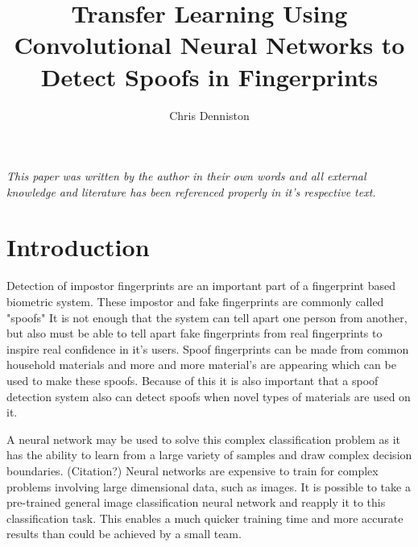 \documentclass[]{article}
\title{Transfer Learning Using Convolutional Neural Networks to Detect Spoofs in Fingerprints}
\author{Chris Denniston}
\begin{document}
\maketitle

\begin{abstract}
\end{abstract}
\textit{This paper was written by the author in their own words and all external knowledge and literature has been referenced properly in it's respective text.}
\section{Introduction}
Detection of impostor fingerprints are an important part of a fingerprint based biometric system. These impostor and fake fingerprints are commonly called "spoofs" It is not enough that the system can tell apart one person from another, but also must be able to tell apart fake fingerprints from real fingerprints to inspire real confidence in it's users. Spoof fingerprints can be made from common household materials and more and more material's are appearing which can be used to make these spoofs. Because of this it is also important that a spoof detection system also can detect spoofs when novel types of materials are used on it. 

A neural network may be used to solve this complex classification problem as it has the ability to learn from a large variety of samples and draw complex decision boundaries. \cite{book} (Citation?) Neural networks are expensive to train for complex problems involving large dimensional data, such as images. It is possible to take a pre-trained general image classification neural network and reapply it to this classification task. This enables a much quicker training time and more accurate results than could be achieved by a small team. 
\end{document}
